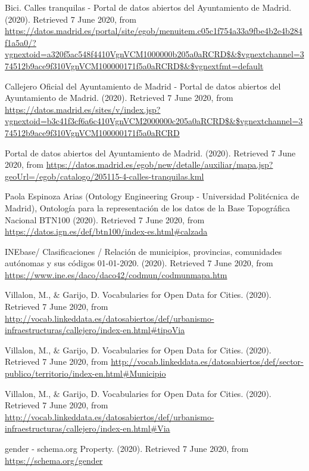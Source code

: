 \begin{thebibliography}{99}
 Bici. Calles tranquilas - Portal de datos abiertos del Ayuntamiento de Madrid. (2020). Retrieved 7 June 2020, from \url{https://datos.madrid.es/portal/site/egob/menuitem.c05c1f754a33a9fbe4b2e4b284f1a5a0/?vgnextoid=a320f5ac548f4410VgnVCM1000000b205a0aRCRD$\&$vgnextchannel=374512b9ace9f310VgnVCM100000171f5a0aRCRD$\&$vgnextfmt=default}


 Callejero Oficial del Ayuntamiento de Madrid - Portal de datos abiertos del Ayuntamiento de Madrid. (2020). Retrieved 7 June 2020, from \url{https://datos.madrid.es/sites/v/index.jsp?vgnextoid=b3c41f3cf6a6c410VgnVCM2000000c205a0aRCRD$\&$vgnextchannel=374512b9ace9f310VgnVCM100000171f5a0aRCRD}


 Portal de datos abiertos del Ayuntamiento de Madrid. (2020). Retrieved 7 June 2020, from \url{https://datos.madrid.es/egob/new/detalle/auxiliar/mapa.jsp?geoUrl=/egob/catalogo/205115-4-calles-tranquilas.kml}


 Paola Espinoza Arias (Ontology Engineering Group - Universidad Politécnica de Madrid), Ontología para la representación de los datos de la Base Topográfica Nacional BTN100 (2020). Retrieved 7 June 2020, from \url{https://datos.ign.es/def/btn100/index-es.html#calzada}

 INEbase/ Clasificaciones / Relación de municipios, provincias, comunidades autónomas y sus códigos 01-01-2020. (2020). Retrieved 7 June 2020, from \url{https://www.ine.es/daco/daco42/codmun/codmunmapa.htm}

 Villalon, M., $\&$ Garijo, D. Vocabularies for Open Data for Cities. (2020). Retrieved 7 June 2020, from \url{http://vocab.linkeddata.es/datosabiertos/def/urbanismo-infraestructuras/callejero/index-en.html#tipoVia}

 Villalon, M., $\&$ Garijo, D. Vocabularies for Open Data for Cities. (2020). Retrieved 7 June 2020, from \url{http://vocab.linkeddata.es/datosabiertos/def/sector-publico/territorio/index-en.html#Municipio}

 Villalon, M., $\&$ Garijo, D. Vocabularies for Open Data for Cities. (2020). Retrieved 7 June 2020, from \url{http://vocab.linkeddata.es/datosabiertos/def/urbanismo-infraestructuras/callejero/index-en.html#Via}

 gender - schema.org Property. (2020). Retrieved 7 June 2020, from \url{https://schema.org/gender}


\end{thebibliography}
